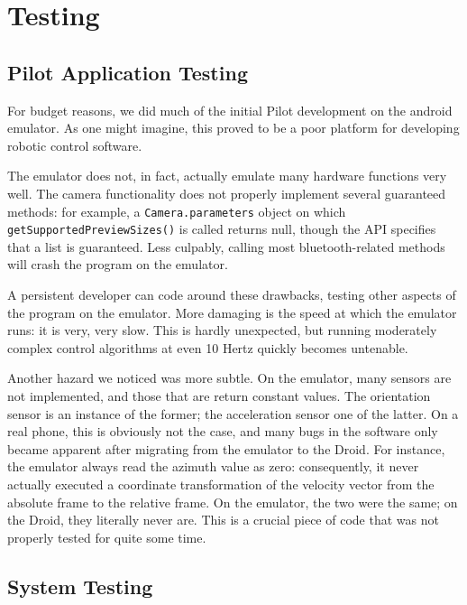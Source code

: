 \documentclass[letterpaper]{article}
\newcommand\code[1]{\texttt{#1}}
\begin{document}
\section{Testing}
\subsection{Pilot Application Testing}
For budget reasons, we did much of the initial Pilot development on
the android emulator.  As one might imagine, this proved to be a poor
platform for developing robotic control software.

The emulator does not, in fact, actually emulate many hardware
functions very well.  The camera functionality does not properly
implement several guaranteed methods: for example, a
\code{Camera.parameters} object on which
\code{getSupportedPreviewSizes()} is called returns null, though the
API specifies that a list is guaranteed.  Less culpably, calling most
bluetooth-related methods will crash the program on the emulator.

A persistent developer can code around these drawbacks, testing other
aspects of the program on the emulator.  More damaging is the speed at
which the emulator runs: it is very, very slow.  This is hardly
unexpected, but running moderately complex control algorithms at even 10
Hertz quickly becomes untenable.

Another hazard we noticed was more subtle.  On the emulator, many
sensors are not implemented, and those that are return constant
values.  The orientation sensor is an instance of the former; the
acceleration sensor one of the latter.  On a real phone, this is
obviously not the case, and many bugs in the software only became
apparent after migrating from the emulator to the Droid.  For
instance, the emulator always read the azimuth value as zero:
consequently, it never actually executed a coordinate transformation
of the velocity vector from the absolute frame to the relative frame.
On the emulator, the two were the same; on the Droid, they literally
never are.  This is a crucial piece of code that was not properly
tested for quite some time.

\subsection{System Testing}
\end{document}
